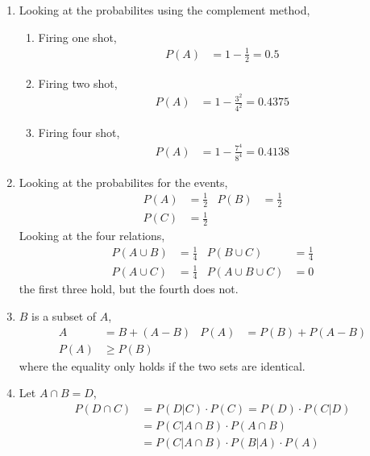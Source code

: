 \begin{enumerate}
    \item Looking at the probabilites using the complement method,
          \begin{enumerate}
              \item Firing one shot,
                    \begin{align}
                        P(A) & = 1 - \frac{1}{2} = 0.5
                    \end{align}
              \item Firing two shot,
                    \begin{align}
                        P(A) & = 1 - \frac{3^2}{4^2} = 0.4375
                    \end{align}
              \item Firing four shot,
                    \begin{align}
                        P(A) & = 1 - \frac{7^4}{8^4} = 0.4138
                    \end{align}
          \end{enumerate}

    \item Looking at the probabilites for the events,
          \begin{align}
              P(A) & = \frac{1}{2} & P(B) & = \frac{1}{2} \\
              P(C) & = \frac{1}{2}
          \end{align}
          Looking at the four relations,
          \begin{align}
              P(A \cup B) & = \frac{1}{4} & P(B \cup C)        & = \frac{1}{4} \\
              P(A \cup C) & = \frac{1}{4} & P(A \cup B \cup C) & = 0
          \end{align}
          the first three hold, but the fourth does not.

    \item $ B $ is a subset of $ A $,
          \begin{align}
              A    & = B + (A-B) & P(A) & = P(B) + P(A-B) \\
              P(A) & \geq P(B)
          \end{align}
          where the equality only holds if the two sets are identical.

    \item Let $ A \cap B = D $,
          \begin{align}
              P(D \cap C) & = P(D|C) \cdot P(C) = P(D) \cdot P(C|D)  \\
                          & = P(C| A \cap B) \cdot P(A \cap B)       \\
                          & = P(C| A \cap B) \cdot P(B|A) \cdot P(A)
          \end{align}


\end{enumerate}
